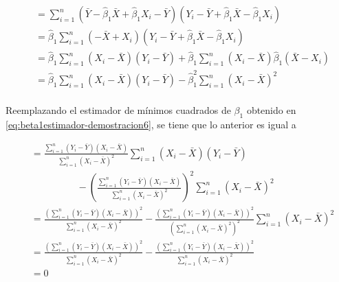 \documentclass[
  11pt,
]{book}
\theoremstyle{definition}
\theoremstyle{definition}
\theoremstyle{definition}
\theoremstyle{definition}
\theoremstyle{remark}
\begin{document}
\begin{equation}
\begin{split}
&= \sum_{i=1}^n\left( \bar{Y} - \widehat{\beta}_1\bar{X} + \widehat{\beta}_1X_i - \bar{Y} \right)\left( Y_i - \bar{Y} + \widehat{\beta}_1\bar{X} - \widehat{\beta}_1X_i \right)\\
&= \widehat{\beta}_1\sum_{i=1}^n\left(-\bar{X}  + X_i \right) \left( Y_i - \bar{Y} + \widehat{\beta}_1\bar{X} - \widehat{\beta}_1X_i \right) \\
&= \widehat{\beta}_1\sum_{i=1}^n\left(X_i -\bar{X} \right) \left( Y_i - \bar{Y}\right) + \widehat{\beta}_1\sum_{i=1}^n\left(X_i -\bar{X} \right)\widehat{\beta}_1 \left( \bar{X} - X_i \right) \\
&= \widehat{\beta}_1\sum_{i=1}^n\left(X_i -\bar{X} \right) \left( Y_i - \bar{Y}\right) - \widehat{\beta}_1^2\sum_{i=1}^n\left(X_i -\bar{X} \right)^2 \\
\end{split}
\label{eq:demostracionSCT4}
\end{equation}

Reemplazando el estimador de mínimos cuadrados de \(\beta_1\) obtenido en \eqref{eq:beta1estimador-demostracion6}, se tiene que lo anterior es igual a

\begin{equation}
\begin{split}
&= \frac{\displaystyle\sum_{i=1}^n (Y_i - \bar{Y})(X_i - \bar{X})}{\displaystyle\sum_{i=1}^n(X_i -\bar{X})^2}\sum_{i=1}^n\left(X_i -\bar{X} \right) \left( Y_i - \bar{Y}\right)\\
& \hspace{2cm} - \left( \frac{\displaystyle\sum_{i=1}^n (Y_i - \bar{Y})(X_i - \bar{X})}{\displaystyle\sum_{i=1}^n(X_i -\bar{X})^2} \right)^2\sum_{i=1}^n\left(X_i -\bar{X} \right)^2 \\
&= \frac{\left(\displaystyle\sum_{i=1}^n (Y_i - \bar{Y})(X_i - \bar{X})\right)^2}{\displaystyle\sum_{i=1}^n(X_i -\bar{X})^2} - \frac{\left( \displaystyle\sum_{i=1}^n (Y_i - \bar{Y})(X_i - \bar{X})\right)^2}{\left(\displaystyle\sum_{i=1}^n(X_i -\bar{X})^2\right)^2} \sum_{i=1}^n\left(X_i -\bar{X} \right)^2 \\
&= \frac{\left(\displaystyle\sum_{i=1}^n (Y_i - \bar{Y})(X_i - \bar{X})\right)^2}{\displaystyle\sum_{i=1}^n(X_i -\bar{X})^2} - \frac{\left( \displaystyle\sum_{i=1}^n (Y_i - \bar{Y})(X_i - \bar{X})\right)^2}{\displaystyle\sum_{i=1}^n(X_i -\bar{X})^2}\\
& = 0
\end{split}
\label{eq:demostracionSCT5}
\end{equation}
\end{document}
